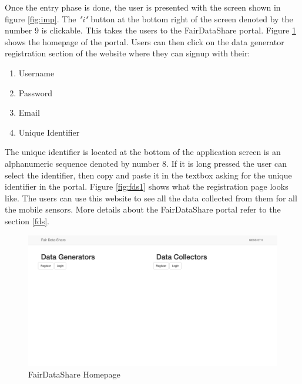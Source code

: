 Once the entry phase is done, the user is presented with the screen shown in figure \ref{fig:imp}.
The {\it "i"} button at the bottom right of the screen denoted by the number 9 is clickable. This takes the users to the FairDataShare portal. Figure \ref{fig:fds_home} shows the homepage of the portal. Users can then click on the data generator registration section of the website where they can signup with their:

\begin{enumerate}
    \item Username
    \item Password
    \item Email
    \item Unique Identifier
\end{enumerate}

The unique identifier is located at the bottom of the application screen is an alphanumeric sequence denoted by number 8. If it is long pressed the user can select the identifier, then copy and paste it in the  textbox asking for the unique identifier in the portal. Figure \ref{fig:fds1} shows what the registration page looks like.
The users can use this website to see all the data collected from them for all the mobile sensors. More details about the FairDataShare portal
refer to the section \ref{fds}.
%

\begin{figure}[ht!]
\centering
\includegraphics[width=\textwidth,keepaspectratio]{./images/fds}
\caption{FairDataShare Homepage}
\label{fig:fds_home}
\end{figure}

